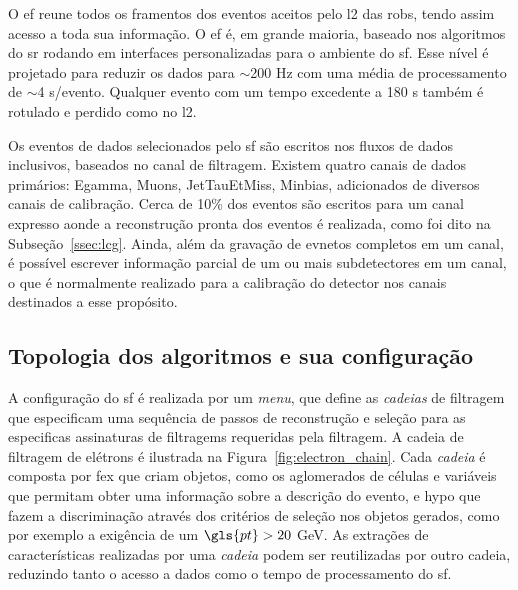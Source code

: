 O \gls{ef} reune todos os framentos dos eventos aceitos pelo \gls{l2} das
\glspl{rob}, tendo assim acesso a toda sua informação. O \gls{ef} é, em grande
maioria, baseado nos algoritmos do \acrlong{sr} rodando em interfaces
personalizadas para o ambiente do \gls{sf}. Esse nível é projetado para reduzir
os dados para $\sim$200 Hz com uma média de processamento de $\sim$4 s/evento.
Qualquer evento com um tempo excedente a 180 s também é rotulado e perdido como
no \gls{l2}. 

Os eventos de dados selecionados pelo \gls{sf} são escritos nos fluxos de dados
inclusivos, baseados no canal de filtragem. Existem quatro canais de dados
primários: Egamma, Muons, JetTauEtMiss, Minbias, adicionados de diversos canais
de calibração. Cerca de 10\% dos eventos são escritos para um canal expresso
aonde a reconstrução pronta dos eventos é realizada, como foi dito na
Subseção~\ref{ssec:lcg}. Ainda, além da gravação de evnetos completos em um
canal, é possível escrever informação parcial de um ou mais subdetectores em um
canal, o que é normalmente realizado para a calibração do detector nos canais
destinados a esse propósito.

\subsection{Topologia dos algoritmos e sua configuração}
\label{ssec:alg_topo}


A configuração do \gls{sf} é realizada por um \emph{menu}, que define as
\emph{cadeias} de filtragem que especificam uma sequência de passos de reconstrução e
seleção para as especificas assinaturas de filtragems requeridas pela filtragem.
A cadeia de filtragem de elétrons é ilustrada na Figura~\ref{fig:electron_chain}.
Cada \emph{cadeia} é composta por \gls{fex} que criam objetos,
como os aglomerados de células e variáveis que permitam obter uma informação
sobre a descrição do evento, e \gls{hypo} que fazem a discriminação através dos
critérios de seleção nos objetos gerados, como por exemplo a exigência de um
$\gls{pt} > 20$ GeV. As extrações de características realizadas por uma
\emph{cadeia} podem ser reutilizadas por outro cadeia, reduzindo tanto o acesso
a dados como o tempo de processamento do \gls{sf}.


